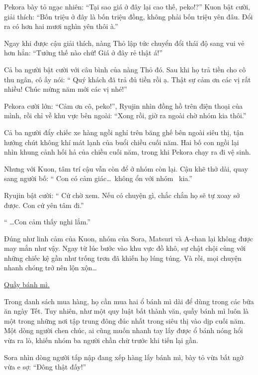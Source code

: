 \documentclass[../main.tex]{subfiles}
\begin{document}
Pekora bày tỏ ngạc nhiên: ``Tại sao giá ở đây lại cao thế, peko!?'' Kuon bật cười, giải thích: ``Bốn triệu ở đây là bốn triệu đồng, không phải bốn triệu yên đâu. Đổi ra có hơn hai mươi nghìn yên thôi à.''

Ngay khi được cậu giải thích, nàng Thỏ lập tức chuyển đổi thái độ sang vui vẻ hơn hẳn: ``Tưởng thế nào chứ! Giá ở đây rẻ thật á!''

Cả ba người bật cười với câu bình của nàng Thỏ đó. Sau khi họ trả tiền cho cô thu ngân, cô ấy nói: ``{\color{red} Quý khách đã trả đủ tiền rồi ạ. Thật sự cảm ơn các vị rất nhiều! Chúc mừng năm mới các vị nhé!}''

Pekora cười lớn: ``Cảm ơn cô, peko!'', Ryujin nhìn đồng hồ trên điện thoại của mình, rồi chỉ về khu vực bên ngoài: ``Xong rồi, giờ ra ngoài chờ nhóm kia thôi.''

Cả ba người đẩy chiếc xe hàng ngồi nghỉ trên băng ghế bên ngoài siêu thị, tận hưởng chút không khí mát lạnh của buổi chiều cuối năm. Hai bố con ngồi lại nhìn khung cảnh hối hả của chiều cuối năm, trong khi Pekora chạy ra đi vệ sinh.

Nhưng với Kuon, tâm trí cậu vẫn còn để ở nhóm còn lại. Cậu khẽ thở dài, quay sang người bố: ``{\color{red} Con có cảm giác\dots\ không ổn với nhóm \hll\ kia.}''

Ryujin bật cười: ``{\color{red} Cứ chờ xem. Nếu có chuyện gì, chắc chắn họ sẽ tự xoay sở được. Con cứ yên tâm đi.}''

``{\color{red} \dots Con cảm thấy nghi lắm.}''

\il

Đúng như linh cảm của Kuon, nhóm của Sora, Matsuri và A-chan lại không được may mắn như vậy. Ngay từ lúc bước vào khu vực đồ khô, sự chật chội cùng với những chiếc kệ gần như trống trơn đã khiến họ lúng túng. Và rồi, mọi chuyện nhanh chóng trở nên lộn xộn\dots

\begin{center}
    \uline{Quầy bánh mì.}
\end{center}

Trong danh sách mua hàng, họ cần mua hai ổ bánh mì dài để dùng trong các bữa ăn ngày Tết. Tuy nhiên, như một quy luật bất thành văn, quầy bánh mì luôn là một trong những  nơi tập trung đông đúc nhất trong siêu thị vào dịp cuối năm. Một dòng người chen chúc, ai cũng muốn nhanh tay lấy được ổ bánh nóng hổi vừa ra lò, khiến nhóm ba người chần chừ trước khi tiến lại gần.

Sora nhìn dòng người tấp nập đang xếp hàng lấy bánh mì, bày tỏ vừa bất ngờ vừa e sợ: ``Đông thật đấy!''
\end{document}
